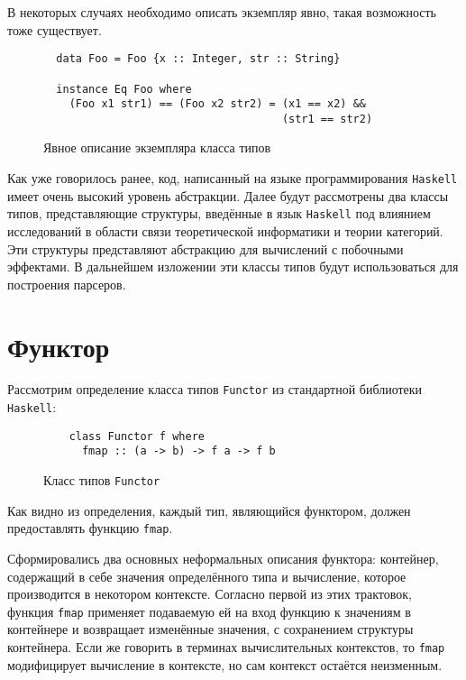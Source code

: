   В некоторых случаях необходимо описать экземпляр явно, такая возможность тоже
  существует.

  \begin{figure}[h]
  \begin{lstlisting}
  data Foo = Foo {x :: Integer, str :: String}

  instance Eq Foo where
    (Foo x1 str1) == (Foo x2 str2) = (x1 == x2) &&
                                     (str1 == str2)
  \end{lstlisting}
  \caption{Явное описание экземпляра класса типов}
  \label{listing:Instance}
  \end{figure}

  Как уже говорилось ранее, код, написанный на языке программирования
  \lstinline{Haskell} имеет очень высокий уровень абстракции. Далее будут
  рассмотрены два классы типов, представляющие структуры, введённые в язык
  \lstinline{Haskell} под влиянием исследований в области связи теоретической
  информатики и теории категорий. Эти структуры представляют абстракцию для
  вычислений с побочными эффектами. В дальнейшем изложении эти классы типов будут
  использоваться для построения парсеров.

\section{Функтор}

  Рассмотрим определение класса типов \lstinline{Functor} из стандартной
  библиотеки \lstinline{Haskell}:

  \begin{figure}[h]
  \begin{lstlisting}
    class Functor f where
      fmap :: (a -> b) -> f a -> f b
  \end{lstlisting}
  \caption{Класс типов \lstinline{Functor}}
  \label{listing:Functor}
  \end{figure}

  Как видно из определения, каждый тип, являющийся функтором, должен предоставлять
  функцию \lstinline{fmap}.

  Сформировались два основных неформальных описания функтора: контейнер,
  содержащий в себе значения определённого типа и вычисление, которое производится
  в некотором контексте. Согласно первой из этих трактовок, функция
  \lstinline{fmap} применяет подаваемую ей на вход функцию к значениям в
  контейнере и возвращает изменённые значения, с сохранением структуры контейнера.
  Если же говорить в терминах вычислительных контекстов, то \lstinline{fmap}
  модифицирует вычисление в контексте, но сам контекст остаётся неизменным.

